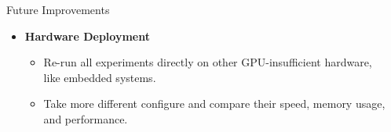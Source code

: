 \documentclass[final]{beamer}
\newlength{\sepwidth}
\newlength{\colwidth}
\newcommand{\separatorcolumn}{\begin{column}{\sepwidth}\end{column}}
\begin{document}
\begin{frame}[t]
\begin{columns}[t]
\begin{column}{\colwidth}
\begin{block}{Future Improvements}
\begin{itemize}
        \item \textbf{Hardware Deployment}
        \begin{itemize}
            \item Re-run all experiments directly on other GPU-insufficient hardware, like embedded systems.
            \item Take more different configure and compare their speed, memory usage, and performance.
        \end{itemize}
    \end{itemize}
    \vspace{-0.1em}
  \end{block}

 \end{column}
 
 \separatorcolumn
\end{columns}
\end{frame}
\end{document}
